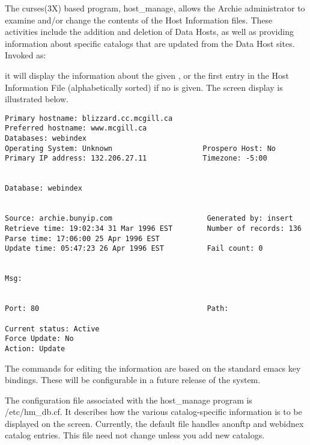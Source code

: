 %
%
%
%
%
%


\label{chap:hostmanage}


The curses(3X) based program, host\_manage, allows the Archie administrator to
examine and/or change the contents of the Host Information files. These
activities include the addition and deletion of Data Hosts, as well as
providing information about specific catalogs that are updated from the Data
Host sites. Invoked as:


it will display the information about the given , or the
first entry in the Host Information File (alphabetically sorted) if no
 is given. The screen display is illustrated below.

\begin{center}
\begin{verbatim}
Primary hostname: blizzard.cc.mcgill.ca
Preferred hostname: www.mcgill.ca
Databases: webindex 
Operating System: Unknown                     Prospero Host: No 
Primary IP address: 132.206.27.11             Timezone: -5:00 


Database: webindex


Source: archie.bunyip.com                      Generated by: insert
Retrieve time: 19:02:34 31 Mar 1996 EST        Number of records: 136
Parse time: 17:06:00 25 Apr 1996 EST
Update time: 05:47:23 26 Apr 1996 EST          Fail count: 0


Msg:


Port: 80                                       Path:

Current status: Active
Force Update: No
Action: Update
\end{verbatim}
\end{center}



The commands for editing the information are based on the standard emacs key
bindings. These will be configurable in a future release of the system.

The configuration file associated with the host\_manage program is
\archie/etc/hm\_db.cf. It describes how the various catalog-specific
information is to be displayed on the screen. Currently, the default file
handles anonftp and webidnex catalog entries. This file need not change
unless you add new catalogs.

